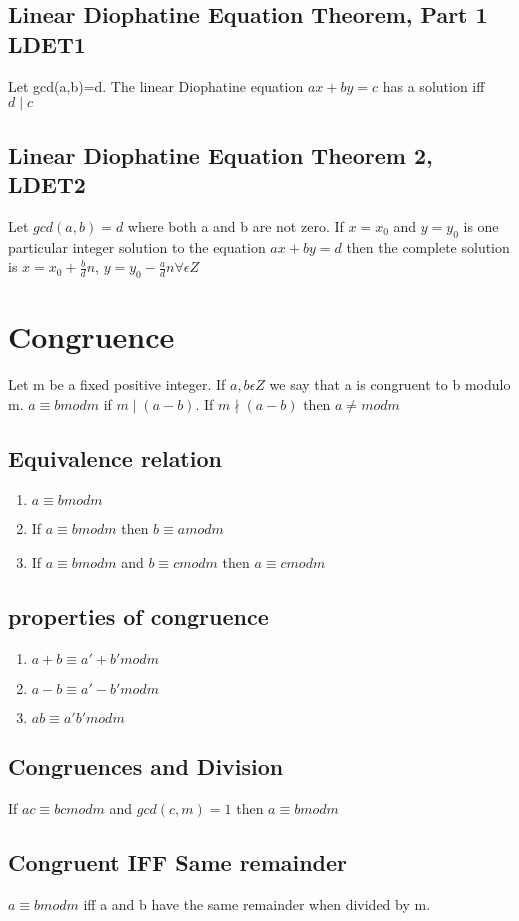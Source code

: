 \documentclass[12pt]{article}
\begin{document}
\subsection{Linear Diophatine Equation Theorem, Part 1 LDET1}
Let gcd(a,b)=d. The linear Diophatine equation $ax+by=c$ has a solution iff
$d\mid c$
\subsection{Linear Diophatine Equation Theorem 2, LDET2}
Let $gcd(a,b)=d$ where both a and b are not zero. If $x=x_0$ and $y=y_0$ is one
particular integer solution to the equation $ax+by=d$ then the complete
solution is $x=x_0+\frac{b}{d} n$, $y=y_0-\frac{a}{d} n \forall \epsilon Z$
\section{Congruence}
Let m be a fixed positive integer. If $a,b \epsilon Z$ we say that a is
congruent to b modulo m. $a\equiv b mod m$ if $m\mid (a-b)$. If $m \nmid (a-b)$
then $a\neq mod m$
\subsection{Equivalence relation}
\begin{enumerate}
\item $a\equiv b mod m$
\item If $a\equiv b mod m $ then $b\equiv a mod m$
\item If $a\equiv b mod m$ and $b\equiv c mod m$ then $a\equiv c mod m$
\end{enumerate}
\subsection{properties of congruence}
\begin{enumerate}
  \item $a+b\equiv a'+b' mod m$
\item $a-b\equiv a'-b'mod m$
\item $ab\equiv a'b'mod m$
\end {enumerate}
\subsection{Congruences and Division}
If $ac\equiv bc mod m$ and $gcd(c,m)=1$ then $a\equiv b mod m$
\subsection{Congruent IFF Same remainder}
$a\equiv b mod m$ iff a and b have the same remainder when divided by m.
\end{document}

